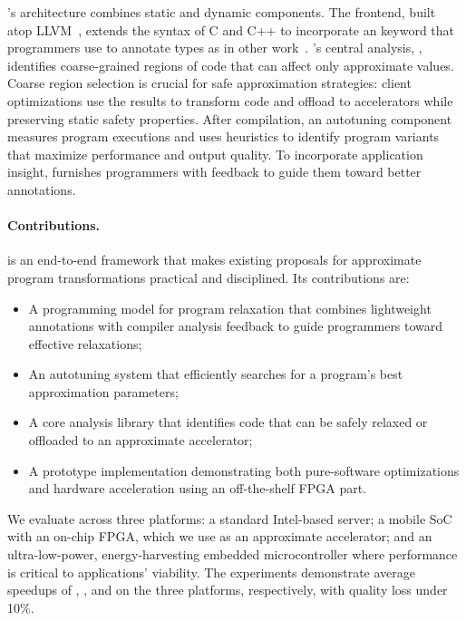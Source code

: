 \sysname's architecture combines static and dynamic components.
The frontend, built atop LLVM~\cite{llvm}, extends the syntax of C and C++ to
incorporate an  keyword that programmers use to annotate types as
in other work~\cite{enerj}.
\sysname's central analysis, \emph{\precisepurity}, identifies coarse-grained
regions of code that can
affect only approximate values.
Coarse region selection is crucial for safe approximation strategies:
client optimizations use the results to
transform code and offload to accelerators while preserving static safety
properties.
After compilation, an autotuning component measures program executions
and uses heuristics to identify program variants that maximize performance and output quality.
To incorporate application insight, \sysname furnishes programmers with feedback
to guide them toward better annotations.


\paragraph{Contributions.}
\sysname is an end-to-end framework that makes existing proposals for approximate
program transformations practical and disciplined.
Its contributions are:
\begin{itemize}
\item A programming model for program relaxation that combines lightweight
annotations with compiler analysis feedback
to guide programmers toward effective relaxations;

\item An autotuning system that efficiently searches for a program's
best approximation parameters;

\item A core analysis library that identifies code that can be safely relaxed
or offloaded to an approximate accelerator;

\item A prototype implementation demonstrating both pure-software optimizations
and hardware acceleration using an off-the-shelf FPGA part.
\end{itemize}

\noindent
We evaluate \sysname across three platforms:
a standard Intel-based server;
a mobile SoC with an on-chip FPGA, which we use as an approximate accelerator;
and an ultra-low-power, energy-harvesting embedded microcontroller where
performance is critical to applications' viability.
The experiments demonstrate average speedups of ,
, and  on the
three platforms, respectively,
with quality loss under 10\%.

